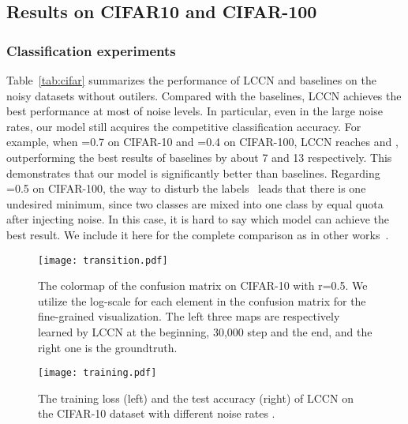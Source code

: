 \documentclass[journal]{IEEEtran}
\begin{document}
\subsection{Results on CIFAR10 and CIFAR-100}
\subsubsection{Classification experiments}
Table~\ref{tab:cifar} summarizes the performance of LCCN and baselines on the noisy datasets without outilers. Compared with the baselines, LCCN achieves the best performance at most of noise levels. In particular, even in the large noise rates, our model still acquires the competitive classification accuracy. For example, when =0.7 on CIFAR-10 and =0.4 on CIFAR-100, LCCN reaches  and , outperforming the best results of baselines by about 7 and 13 respectively. This demonstrates that our model is significantly better than baselines. Regarding =0.5 on CIFAR-100, the way to disturb the labels~\cite{patrini2017making} leads that there is one undesired minimum, since two classes are mixed into one class by equal quota after injecting noise. In this case, it is hard to say which model can achieve the best result. We include it here for the complete comparison as in other works~\cite{patrini2017making,goldberger2016training}.

\begin{figure*}[ht]
\centering
\centering
\texttt{[image: transition.pdf]}
\caption{The colormap of the confusion matrix on CIFAR-10 with r=0.5. We utilize the log-scale for each element in the confusion matrix for the fine-grained visualization. The left three maps are respectively learned by LCCN at the beginning, 30,000 step and the end, and the right one is the groundtruth.}
\label{fig:transition}
\end{figure*}

\begin{figure} 
\centering
\texttt{[image: training.pdf]}
\caption{The training loss (left) and the test accuracy (right) of LCCN on the CIFAR-10 dataset with different noise rates .}\label{fig:training}
\end{figure}
\end{document}
